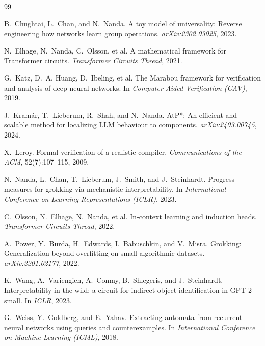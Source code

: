 \documentclass[11pt]{article}
\begin{document}
\begin{thebibliography}{99}
\small

B.~Chughtai, L.~Chan, and N.~Nanda.
\newblock A toy model of universality: Reverse engineering how networks learn
  group operations.
\newblock \emph{arXiv:2302.03025}, 2023.

N.~Elhage, N.~Nanda, C.~Olsson, et al.
\newblock A mathematical framework for Transformer circuits.
\newblock \emph{Transformer Circuits Thread}, 2021.

G.~Katz, D.~A. Huang, D.~Ibeling, et al.
\newblock The Marabou framework for verification and analysis of deep neural
  networks.
\newblock In \emph{Computer Aided Verification (CAV)}, 2019.

J.~Kram\'ar, T.~Lieberum, R.~Shah, and N.~Nanda.
\newblock AtP*: An efficient and scalable method for localizing LLM behaviour to
  components.
\newblock \emph{arXiv:2403.00745}, 2024.

X.~Leroy.
\newblock Formal verification of a realistic compiler.
\newblock \emph{Communications of the ACM}, 52(7):107--115, 2009.

N.~Nanda, L.~Chan, T.~Lieberum, J.~Smith, and J.~Steinhardt.
\newblock Progress measures for grokking via mechanistic interpretability.
\newblock In \emph{International Conference on Learning Representations (ICLR)},
  2023.

C.~Olsson, N.~Elhage, N.~Nanda, et al.
\newblock In-context learning and induction heads.
\newblock \emph{Transformer Circuits Thread}, 2022.

A.~Power, Y.~Burda, H.~Edwards, I.~Babuschkin, and V.~Misra.
\newblock Grokking: Generalization beyond overfitting on small algorithmic
  datasets.
\newblock \emph{arXiv:2201.02177}, 2022.

K.~Wang, A.~Variengien, A.~Conmy, B.~Shlegeris, and J.~Steinhardt.
\newblock Interpretability in the wild: a circuit for indirect object
  identification in GPT-2 small.
\newblock In \emph{ICLR}, 2023.

G.~Weiss, Y.~Goldberg, and E.~Yahav.
\newblock Extracting automata from recurrent neural networks using queries and
  counterexamples.
\newblock In \emph{International Conference on Machine Learning (ICML)}, 2018.


\end{thebibliography}
\end{document}
